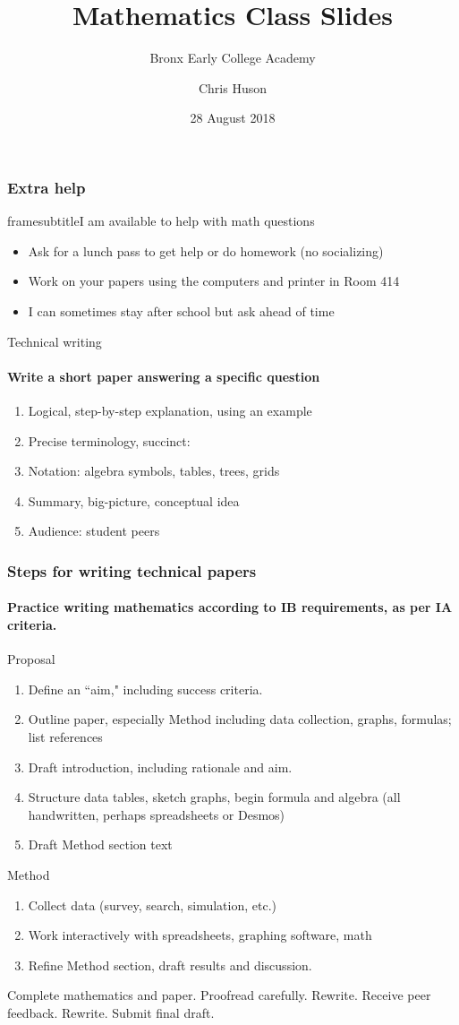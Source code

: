 \documentclass{beamer}
\title{Mathematics Class Slides}
\subtitle{Bronx Early College Academy}
\author{Chris Huson}
\date{28 August 2018}
\begin{document}
\frame{\titlepage}

\frame
{
  \frametitle{Extra help}
  framesubtitle{I am available to help with math questions}
\begin{itemize}
      \item Ask for a lunch pass to get help or do homework (no socializing)
      \item Work on your papers using the computers and printer in Room 414
      \item I can sometimes stay after school but ask ahead of time
\end{itemize}
 }

  \begin{frame}{Technical writing}
      \framesubtitle{Write a short paper answering a specific question}
      \begin{enumerate}
          \item Logical, step-by-step explanation, using an example
          \item Precise terminology, succinct:
          \item Notation: algebra symbols, tables, trees, grids
          \item Summary, big-picture, conceptual idea
          \item Audience: student peers
      \end{enumerate}
  \end{frame}

 \frame
 {
   \frametitle{Steps for writing technical papers}
   \framesubtitle{Practice writing mathematics according to IB requirements, as per IA criteria.}
 Proposal
 \begin{enumerate}
     \item Define an ``aim," including success criteria.
     \item Outline paper, especially Method including data collection, graphs, formulas; list references
     \item Draft introduction, including rationale and aim.
     \item Structure data tables, sketch graphs, begin formula and algebra (all handwritten, perhaps spreadsheets or Desmos)
     \item Draft Method section text
 \end{enumerate}
 Method
 \begin{enumerate}
     \item Collect data (survey, search, simulation, etc.)
     \item Work interactively with spreadsheets, graphing software, math
     \item Refine Method section, draft results and discussion.
 \end{enumerate}
 Complete mathematics and paper. Proofread carefully. Rewrite. Receive peer feedback. Rewrite. Submit final draft.
 }
\end{document}
